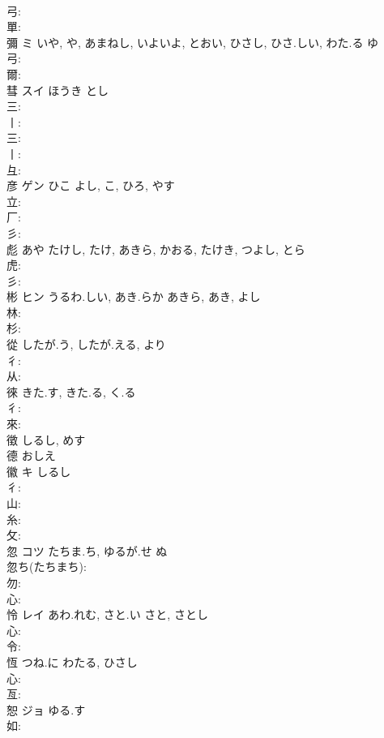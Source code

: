 \documentclass[8pt]{extreport}
\begin{document}
\begin{CJK}{UTF8}{min}
\\	弓: 
\\	單: 
\\	彌	ミ	いや, や, あまねし, いよいよ, とおい, ひさし, ひさ.しい, わた.る	ゆ			
\\	弓: 
\\	爾: 
\\	彗	スイ	ほうき	とし	
\\	三: 
\\	丨: 
\\	三: 
\\	丨: 
\\	彑: 
\\	彦	ゲン	ひこ	よし, こ, ひろ, やす	
\\	立: 
\\	厂: 
\\	彡: 
\\	彪		あや	たけし, たけ, あきら, かおる, たけき, つよし, とら		
\\	虎: 
\\	彡: 
\\	彬	ヒン	うるわ.しい, あき.らか	あきら, あき, よし	
\\	林: 
\\	杉: 
\\	從		したが.う, したが.える, より				
\\	彳: 
\\	从: 
\\	徠		きた.す, きた.る, く.る				
\\	彳: 
\\	來: 
\\	徵		しるし, めす				
\\	德		おしえ				
\\	徽	キ	しるし		
\\	彳: 
\\	山: 
\\	糸: 
\\	攵: 
\\	忽	コツ	たちま.ち, ゆるが.せ	ぬ	
\\	忽ち(たちまち): 
\\	勿: 
\\	心: 
\\	怜	レイ	あわ.れむ, さと.い	さと, さとし	
\\	心: 
\\	令: 
\\	恆		つね.に	わたる, ひさし			
\\	心: 
\\	亙: 
\\	恕	ジョ	ゆる.す		
\\	如: 

\end{CJK}
\end{document}
